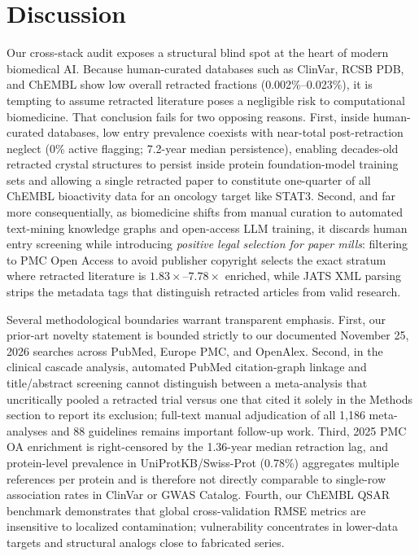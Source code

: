 \documentclass[11pt,letterpaper]{article}
\begin{document}
\section{Discussion}
Our cross-stack audit exposes a structural blind spot at the heart of modern biomedical AI. Because human-curated databases such as ClinVar, RCSB PDB, and ChEMBL show low overall retracted fractions (0.002\%--0.023\%), it is tempting to assume retracted literature poses a negligible risk to computational biomedicine. That conclusion fails for two opposing reasons. First, inside human-curated databases, low entry prevalence coexists with near-total post-retraction neglect (0\% active flagging; 7.2-year median persistence), enabling decades-old retracted crystal structures to persist inside protein foundation-model training sets and allowing a single retracted paper to constitute one-quarter of all ChEMBL bioactivity data for an oncology target like STAT3. Second, and far more consequentially, as biomedicine shifts from manual curation to automated text-mining knowledge graphs and open-access LLM training, it discards human entry screening while introducing \emph{positive legal selection for paper mills}: filtering to PMC Open Access to avoid publisher copyright selects the exact stratum where retracted literature is $1.83\times$--$7.78\times$ enriched, while JATS XML parsing strips the metadata tags that distinguish retracted articles from valid research.

Several methodological boundaries warrant transparent emphasis. First, our prior-art novelty statement is bounded strictly to our documented November 25, 2026 searches across PubMed, Europe PMC, and OpenAlex. Second, in the clinical cascade analysis, automated PubMed citation-graph linkage and title/abstract screening cannot distinguish between a meta-analysis that uncritically pooled a retracted trial versus one that cited it solely in the Methods section to report its exclusion; full-text manual adjudication of all 1,186 meta-analyses and 88 guidelines remains important follow-up work. Third, 2025 PMC OA enrichment is right-censored by the 1.36-year median retraction lag, and protein-level prevalence in UniProtKB/Swiss-Prot (0.78\%) aggregates multiple references per protein and is therefore not directly comparable to single-row association rates in ClinVar or GWAS Catalog. Fourth, our ChEMBL QSAR benchmark demonstrates that global cross-validation RMSE metrics are insensitive to localized contamination; vulnerability concentrates in lower-data targets and structural analogs close to fabricated series.
\end{document}

